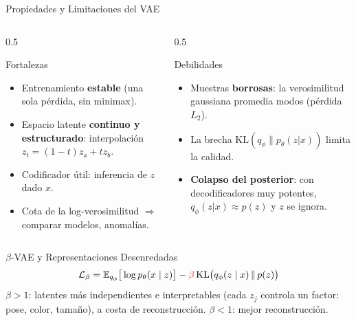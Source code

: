 \documentclass[aspectratio=169, 10pt]{beamer}
\providecommand{\E}{\mathbb{E}}
\newcommand{\KL}{\mathrm{KL}}
\newcommand{\ad}[1]{{\color{AdaptRed}#1}}
\begin{document}
\begin{frame}[shrink]{Propiedades y Limitaciones del VAE}

	\begin{columns}[T]
		\begin{column}{0.5\textwidth}
			\begin{block}{Fortalezas}
				\small
				\begin{itemize}
					\item Entrenamiento \textbf{estable} (una sola p\'erdida, sin minimax).
					\item Espacio latente \textbf{continuo y estructurado}: interpolaci\'on $z_t = (1-t)z_a + t z_b$.
					\item Codificador \'util: inferencia de $z$ dado $x$.
					\item Cota de la log-verosimilitud $\Rightarrow$ comparar modelos, anomal\'ias.
				\end{itemize}
			\end{block}
		\end{column}

		\begin{column}{0.5\textwidth}
			\begin{alertblock}{Debilidades}
				\small
				\begin{itemize}
					\item Muestras \textbf{borrosas}: la verosimilitud gaussiana promedia modos (p\'erdida $L_2$).
					\item La brecha $\KL(q_\phi\|p_\theta(z|x))$ limita la calidad.
					\item \textbf{Colapso del posterior}: con decodificadores muy potentes, $q_\phi(z|x) \approx p(z)$ y $z$ se ignora.
				\end{itemize}
			\end{alertblock}
		\end{column}
	\end{columns}

	\vspace{0.3cm}

	\begin{block}{$\beta$-VAE y Representaciones Desenredadas}
		\[
		\mathcal{L}_\beta = \E_{q_\phi}\big[\log p_\theta(x\mid z)\big] - \ad{\beta}\, \KL\big(q_\phi(z\mid x)\,\|\,p(z)\big)
		\]
		\small $\beta > 1$: latentes m\'as independientes e interpretables (cada $z_j$ controla un factor: pose, color, tama\~no), a costa de reconstrucci\'on. $\beta < 1$: mejor reconstrucci\'on.
	\end{block}

\end{frame}
\end{document}

